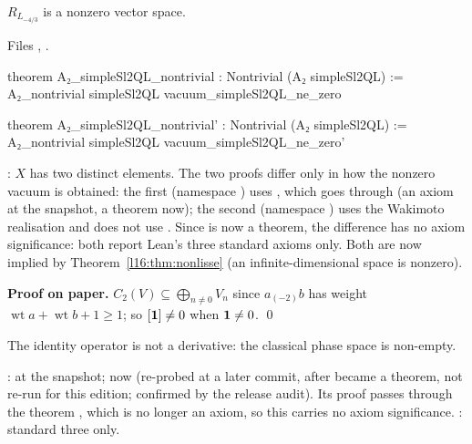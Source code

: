 \begin{theorem}\label{l16:thm:nontriv}
$R_{L_{-4/3}}$ is a nonzero vector space.
\end{theorem}
\noindent Files ,
.
\begin{leancode}
theorem A₂_simpleSl2QL_nontrivial : Nontrivial (A₂ simpleSl2QL) :=
  A₂_nontrivial simpleSl2QL vacuum_simpleSl2QL_ne_zero

theorem A₂_simpleSl2QL_nontrivial' : Nontrivial (A₂ simpleSl2QL) :=
  A₂_nontrivial simpleSl2QL vacuum_simpleSl2QL_ne_zero'
\end{leancode}

\begin{dictionary}
: $X$ has two distinct elements. The two proofs differ only in how the nonzero vacuum is obtained: the
first (namespace ) uses \allowbreak{}\allowbreak{}, which goes through
 (an axiom at the snapshot, a theorem now); the second (namespace ) uses the Wakimoto realisation and
does not use . Since  is now a theorem, the difference has no axiom significance: both
report Lean's three standard axioms only. Both are now
implied by Theorem~\ref{l16:thm:nonlisse} (an infinite-dimensional space is nonzero).
\end{dictionary}

\textbf{Proof on paper.} $C_2(V)\subseteq\bigoplus_{n\ne0}V_n$ since $a_{(-2)}b$ has weight $\operatorname{wt}a+\operatorname{wt}b+1\ge1$;
so $[\mathbf{1}]\ne0$ when $\mathbf{1}\ne0$. \qed

\begin{physics}
The identity operator is not a derivative: the classical phase space is non-empty.
\end{physics}

\begin{status}
\allowbreak{}\allowbreak{}: \lean{[propext, Classical.}\allowbreak{}\allowbreak{}\allowbreak\lean{pbw]} at the snapshot;
now  (re-probed at a later commit, after  became a theorem, not re-run for this edition; confirmed by the release audit). Its
proof passes through the theorem , which is no longer an axiom, so this carries no axiom significance.
\allowbreak{}: standard three only.
\end{status}

